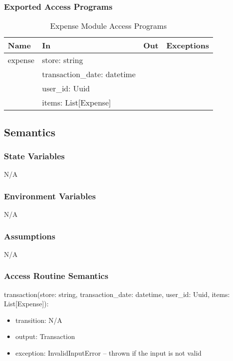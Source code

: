 \documentclass[12pt, titlepage]{article}
\begin{document}
\subsubsection{Exported Access Programs}

\begin{center}
  \begin{table}[H]
    \caption{Expense Module Access Programs}
\begin{tabular}{p{4cm} p{4cm} p{4cm} p{4cm}}
\hline
\textbf{Name} & \textbf{In} & \textbf{Out} & \textbf{Exceptions} \\
\hline
expense & store: string &  &  \\
  & transaction\_date: datetime &  &  \\
  & user\_id: Uuid &  &  \\
  & items: List[Expense] &  &  \\
\hline
\end{tabular}
\end{table}
\end{center}

\subsection{Semantics}

\subsubsection{State Variables}
N/A

\subsubsection{Environment Variables}
N/A

\subsubsection{Assumptions}
N/A

\subsubsection{Access Routine Semantics}

\noindent transaction(store: string, transaction\_date: datetime, user\_id: Uuid, items: List[Expense]):
\begin{itemize}
\item transition: N/A
\item output: Transaction
\item exception: InvalidInputError -- thrown if the input is not valid
\end{itemize}
\end{document}
